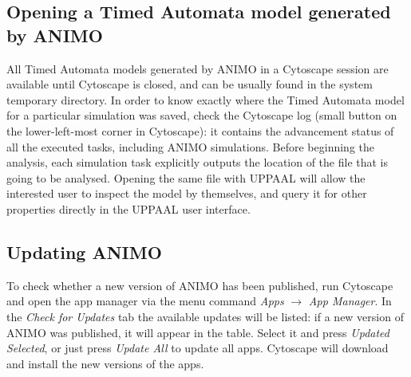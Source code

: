 \documentclass{article}
\begin{document}
\subsection{Opening a Timed Automata model generated by ANIMO}
All Timed Automata models generated by ANIMO in a Cytoscape session are available
until Cytoscape is closed, and can be usually found in the system temporary directory.
In order to know exactly where the Timed Automata model for a particular simulation
was saved, check the Cytoscape log (small button on the lower-left-most corner in Cytoscape):
it contains the advancement status of all the executed tasks, including ANIMO simulations.
Before beginning the analysis, each simulation task explicitly outputs the location
of the file that is going to be analysed. Opening the same file with UPPAAL will allow
the interested user to inspect the model by themselves, and query it for other properties
directly in the UPPAAL user interface.


\subsection{Updating ANIMO}
To check whether a new version of ANIMO has been published, run Cytoscape and open
the app manager via the menu command \emph{Apps} $\rightarrow$ \emph{App Manager}.
In the \emph{Check for Updates} tab the available updates will be listed:
if a new version of ANIMO was published, it will appear in the table. Select it
and press \emph{Updated Selected}, or just press \emph{Update All} to update all apps.
Cytoscape will download and install the new versions of the apps.
\end{document}
